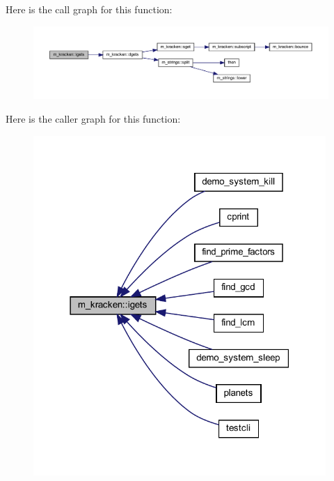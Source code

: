 Here is the call graph for this function\+:
\nopagebreak
\begin{figure}[H]
\begin{center}
\leavevmode
\includegraphics[width=350pt]{namespacem__kracken_ac118bb44d855d68bfce6caa80d60e5e0_cgraph}
\end{center}
\end{figure}
Here is the caller graph for this function\+:
\nopagebreak
\begin{figure}[H]
\begin{center}
\leavevmode
\includegraphics[width=315pt]{namespacem__kracken_ac118bb44d855d68bfce6caa80d60e5e0_icgraph}
\end{center}
\end{figure}
\mbox{\label{namespacem__kracken_a850dce381e1cfe18a4ebcaa214995e39}} 
